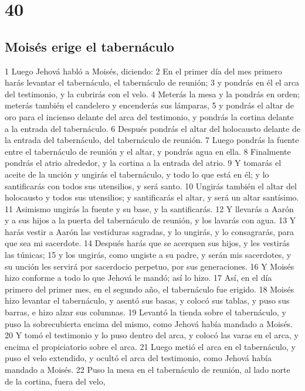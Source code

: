 \chapter{40}

\section{Moisés erige el tabernáculo}

1 Luego Jehová habló a Moisés, diciendo:
2 En el primer día del mes primero harás levantar el tabernáculo, el tabernáculo de reunión;
3 y pondrás en él el arca del testimonio, y la cubrirás con el velo.
4 Meterás la mesa y la pondrás en orden; meterás también el candelero y encenderás sus lámparas,
5 y pondrás el altar de oro para el incienso delante del arca del testimonio, y pondrás la cortina delante a la entrada del tabernáculo.
6 Después pondrás el altar del holocausto delante de la entrada del tabernáculo, del tabernáculo de reunión.
7 Luego pondrás la fuente entre el tabernáculo de reunión y el altar, y pondrás agua en ella.
8 Finalmente pondrás el atrio alrededor, y la cortina a la entrada del atrio.
9 Y tomarás el aceite de la unción y ungirás el tabernáculo, y todo lo que está en él; y lo santificarás con todos sus utensilios, y será santo.
10 Ungirás también el altar del holocausto y todos sus utensilios; y santificarás el altar, y será un altar santísimo.
11 Asimismo ungirás la fuente y su base, y la santificarás.
12 Y llevarás a Aarón y a sus hijos a la puerta del tabernáculo de reunión, y los lavarás con agua.
13 Y harás vestir a Aarón las vestiduras sagradas, y lo ungirás, y lo consagrarás, para que sea mi sacerdote.
14 Después harás que se acerquen sus hijos, y les vestirás las túnicas;
15 y los ungirás, como ungiste a su padre, y serán mis sacerdotes, y su unción les servirá por sacerdocio perpetuo, por sus generaciones.
16 Y Moisés hizo conforme a todo lo que Jehová le mandó; así lo hizo.
17 Así, en el día primero del primer mes, en el segundo año, el tabernáculo fue erigido.
18 Moisés hizo levantar el tabernáculo, y asentó sus basas, y colocó sus tablas, y puso sus barras, e hizo alzar sus columnas.
19 Levantó la tienda sobre el tabernáculo, y puso la sobrecubierta encima del mismo, como Jehová había mandado a Moisés.
20 Y tomó el testimonio y lo puso dentro del arca, y colocó las varas en el arca, y encima el propiciatorio sobre el arca.
21 Luego metió el arca en el tabernáculo, y puso el velo extendido, y ocultó el arca del testimonio, como Jehová había mandado a Moisés.
22 Puso la mesa en el tabernáculo de reunión, al lado norte de la cortina, fuera del velo,
